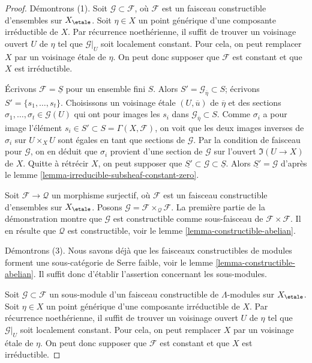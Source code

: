 \begin{proof}
Démontrons (1). Soit $\mathcal{G} \subset \mathcal{F}$, où $\mathcal{F}$ est
un faisceau constructible d'ensembles sur $X_\etale$. Soit $\eta \in X$ un point
générique d'une composante irréductible de $X$. Par récurrence noethérienne,
il suffit de trouver un voisinage ouvert $U$ de $\eta$ tel que
$\mathcal{G}|_U$ soit localement constant. Pour cela, on peut remplacer $X$
par un voisinage \'etale de $\eta$.
On peut donc supposer que $\mathcal{F}$ est constant et que $X$ est irréductible.

\medskip\noindent
Écrivons $\mathcal{F} = \underline{S}$ pour un ensemble fini $S$.
Alors $S' = \mathcal{G}_{\overline{\eta}} \subset S$;
écrivons $S' = \{s_1, \ldots, s_t\}$.
Choisissons un voisinage \'etale $(U, \overline{u})$ de $\overline{\eta}$
et des sections $\sigma_1, \ldots, \sigma_t \in \mathcal{G}(U)$ qui ont pour images
les $s_i$ dans $\mathcal{G}_{\overline{\eta}} \subset S$.
Comme $\sigma_i$ a pour image l'élément
$s_i \in S' \subset S = \Gamma(X, \mathcal{F})$,
on voit que les deux images inverses de $\sigma_i$ sur $U \times_X U$
sont égales en tant que sections de $\mathcal{G}$. Par la condition de faisceau
pour $\mathcal{G}$, on en déduit que $\sigma_i$ provient d'une section
de $\mathcal{G}$ sur l'ouvert $\Im(U \to X)$ de $X$.
Quitte à rétrécir $X$, on peut supposer que
$\underline{S'} \subset \mathcal{G} \subset \underline{S}$.
Alors $\underline{S'} = \mathcal{G}$ d'après le
lemme \ref{lemma-irreducible-subsheaf-constant-zero}.

\medskip\noindent
Soit $\mathcal{F} \to \mathcal{Q}$ un morphisme surjectif, où $\mathcal{F}$ est
un faisceau constructible d'ensembles sur $X_\etale$. Posons
$\mathcal{G} = \mathcal{F} \times_\mathcal{Q} \mathcal{F}$.
La première partie de la démonstration montre que $\mathcal{G}$ est
constructible comme sous-faisceau de $\mathcal{F} \times \mathcal{F}$.
Il en résulte que $\mathcal{Q}$ est constructible, voir le
lemme \ref{lemma-constructible-abelian}.

\medskip\noindent
Démontrons (3). Nous savons déjà que les faisceaux constructibles de modules
forment une sous-catégorie de Serre faible, voir le lemme \ref{lemma-constructible-abelian}.
Il suffit donc d'établir l'assertion concernant les sous-modules.

\medskip\noindent
Soit $\mathcal{G} \subset \mathcal{F}$ un sous-module d'un
faisceau constructible de $\Lambda$-modules sur $X_\etale$. Soit $\eta \in X$
un point générique d'une composante irréductible de $X$. Par récurrence noethérienne,
il suffit de trouver un voisinage ouvert $U$ de $\eta$ tel que
$\mathcal{G}|_U$ soit localement constant. Pour cela, on peut remplacer $X$
par un voisinage \'etale de $\eta$. On peut donc supposer que $\mathcal{F}$
est constant et que $X$ est irréductible.


\end{proof}

